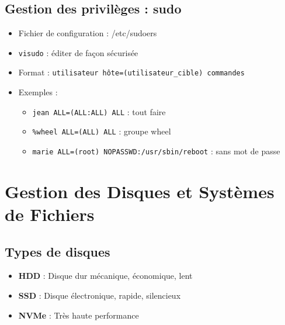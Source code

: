 \documentclass[12pt,a4paper]{article}
\begin{document}
\subsection{Gestion des privil\`eges : sudo}
\begin{itemize}
    \item Fichier de configuration : /etc/sudoers %
    \item \texttt{visudo} : \'editer de fa\c{c}on s\'ecuris\'ee %
    \item Format : \texttt{utilisateur h\^ote=(utilisateur\_cible) commandes} %
    \item Exemples :
    \begin{itemize}
        \item \texttt{jean ALL=(ALL:ALL) ALL} : tout faire %
        \item \texttt{\%wheel ALL=(ALL) ALL} : groupe wheel %
        \item \texttt{marie ALL=(root) NOPASSWD:/usr/sbin/reboot} : sans mot de passe %
    \end{itemize}
\end{itemize}


\section{Gestion des Disques et Syst\`emes de Fichiers}


\subsection{Types de disques}
\begin{itemize}
    \item \textbf{HDD} : Disque dur m\'ecanique, \'economique, lent
    \item \textbf{SSD} : Disque \'electronique, rapide, silencieux
    \item \textbf{NVMe} : Tr\`es haute performance
\end{itemize}
\end{document}

